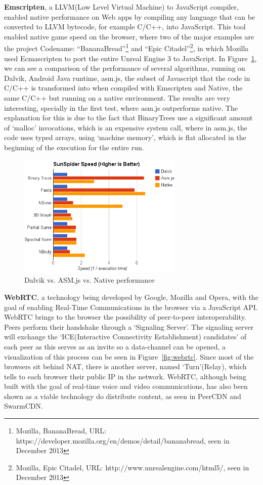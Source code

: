 \textbf{Emscripten}\cite{Zakai2011}, a LLVM(Low Level Virtual Machine) to JavaScript compiler, enabled native performance on Web apps by compiling any language that can be converted to LLVM bytecode, for example C/C++, into JavaScript. This tool enabled native game speed on the browser, where two of the major examples are the project Codename: ``BananaBread''\footnote{Mozilla, BananaBread,  URL: https://developer.mozilla.org/en/demos/detail/bananabread, seen in December 2013} and ``Epic Citadel''\footnote{Mozilla, Epic Citadel,  URL: http://www.unrealengine.com/html5/, seen in December 2013}, in which Mozilla used Ecmascripten to port the entire Unreal Engine 3 to JavaScript. In Figure~\ref{fig:dan}, we can see a comparison of the performance of several algorithms, running on Dalvik, Android Java runtime, asm.js, the subset of Javascript that the code in C/C++ is transformed into when compiled with Emscripten and Native, the same C/C++ but running on a native environment. The results are very interesting, specially in the first test, where asm.js outperforms native. The explanation for this is due to the fact that BinaryTrees use a significant amount of `malloc' invocations, which is an expensive system call, where in asm.js, the code uses typed arrays, using `machine memory', which is flat allocated in the beginning of the execution for the entire run.

\begin{figure}[h!]
  \centering
  \includegraphics[width=0.7\textwidth]{img/Dalvik-vs-ASM-vs-Native-edited}
  \caption{Dalvik vs. ASM.js vs. Native performance}
  \label{fig:dan}
\end{figure}

\textbf{WebRTC}\cite{IanHickson2013}, a technology being developed by Google, Mozilla and Opera, with the goal of enabling Real-Time Communications in the browser via a JavaScript API. WebRTC brings to the browser the possibility of peer-to-peer interoperability. Peers perform their handshake through a `Signaling Server'. The signaling server will exchange the `ICE(Interactive Connectivity Establishment) candidates' of each peer as this serves as an invite so a data-channel can be opened, a visualization of this process can be seen in Figure~\ref{fig:webrtc}. Since most of the browsers sit behind NAT, there is another server, named `Turn'(Relay), which tells to each browser their public IP in the network. WebRTC, although being built with the goal of real-time voice and video communications, has also been shown as a viable technology do distribute content, as seen in PeerCDN and SwarmCDN\cite{Vogt}.

